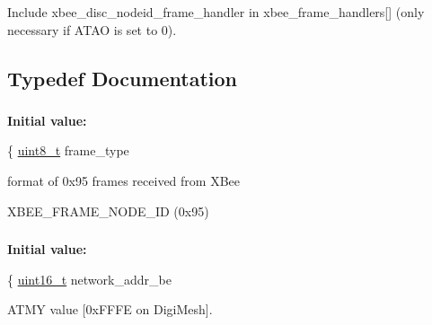 Include xbee\-\_\-disc\-\_\-nodeid\-\_\-frame\-\_\-handler in xbee\-\_\-frame\-\_\-handlers\mbox{[}\mbox{]} (only necessary if A\-T\-A\-O is set to 0). 



\subsection{Typedef Documentation}
\hypertarget{group__xbee__discovery_ga6343d5dfdcee86d1d294b1bafb8d6f23}{
\subsubsection[{xbee\-\_\-frame\-\_\-node\-\_\-id\-\_\-t}]{}}\label{group__xbee__discovery_ga6343d5dfdcee86d1d294b1bafb8d6f23}
{\bfseries Initial value\-:}
\begin{DoxyCode}
\{
   \hyperlink{group__hal_gae1affc9ca37cfb624959c866a73f83c2}{uint8\_t}          frame\_type
\end{DoxyCode}


format of 0x95 frames received from X\-Bee 

X\-B\-E\-E\-\_\-\-F\-R\-A\-M\-E\-\_\-\-N\-O\-D\-E\-\_\-\-I\-D (0x95) \hypertarget{group__xbee__discovery_gaf00a7a98eff47e084bf5f8741bf41220}{
\subsubsection[{xbee\-\_\-node\-\_\-id1\-\_\-t}]{}}\label{group__xbee__discovery_gaf00a7a98eff47e084bf5f8741bf41220}
{\bfseries Initial value\-:}
\begin{DoxyCode}
\{
   \hyperlink{group__hal_ga5a8b2dc9e45a9ee81a94ef304fb62505}{uint16\_t}        network\_addr\_be
\end{DoxyCode}


A\-T\-M\-Y value \mbox{[}0x\-F\-F\-F\-E on Digi\-Mesh\mbox{]}. 

